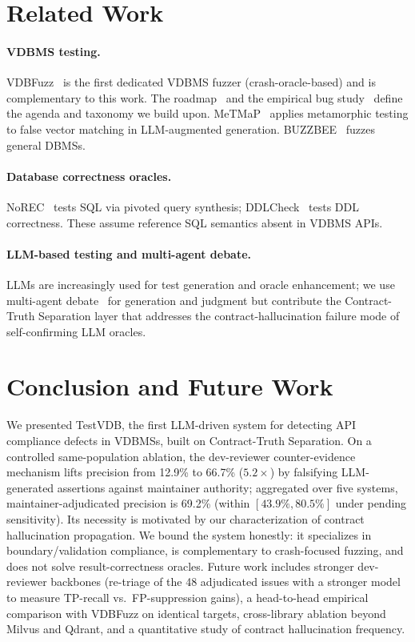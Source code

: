 \documentclass[sigconf]{acmart}
\begin{document}
\section{Related Work}\label{sec:rw}
\paragraph{VDBMS testing.} VDBFuzz~\cite{vdbfuzz26} is the first dedicated VDBMS fuzzer (crash-oracle-based) and is complementary to this work. The roadmap~\cite{roadmap25} and the empirical bug study~\cite{bugstudy25} define the agenda and taxonomy we build upon. MeTMaP~\cite{metmap24} applies metamorphic testing to false vector matching in LLM-augmented generation. BUZZBEE~\cite{buzzbee24} fuzzes general DBMSs.
\paragraph{Database correctness oracles.} NoREC~\cite{norec20} tests SQL via pivoted query synthesis; DDLCheck~\cite{ddlcheck25} tests DDL correctness. These assume reference SQL semantics absent in VDBMS APIs.
\paragraph{LLM-based testing and multi-agent debate.} LLMs are increasingly used for test generation and oracle enhancement; we use multi-agent debate~\cite{du2023improving} for generation and judgment but contribute the Contract-Truth Separation layer that addresses the contract-hallucination failure mode of self-confirming LLM oracles.

\section{Conclusion and Future Work}\label{sec:conc}
We presented TestVDB, the first LLM-driven system for detecting API compliance defects in VDBMSs, built on Contract-Truth Separation. On a controlled same-population ablation, the dev-reviewer counter-evidence mechanism lifts precision from 12.9\% to 66.7\% ($5.2\times$) by falsifying LLM-generated assertions against maintainer authority; aggregated over five systems, maintainer-adjudicated precision is 69.2\% (within $[43.9\%, 80.5\%]$ under pending sensitivity). Its necessity is motivated by our characterization of contract hallucination propagation. We bound the system honestly: it specializes in boundary/validation compliance, is complementary to crash-focused fuzzing, and does not solve result-correctness oracles. Future work includes stronger dev-reviewer backbones (re-triage of the 48 adjudicated issues with a stronger model to measure TP-recall vs.\ FP-suppression gains), a head-to-head empirical comparison with VDBFuzz on identical targets, cross-library ablation beyond Milvus and Qdrant, and a quantitative study of contract hallucination frequency.
\end{document}
